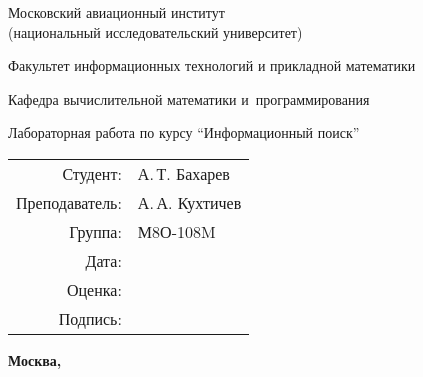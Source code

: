 \begin{titlepage}
\begin{center}
\bfseries

{\Large Московский авиационный институт\\ (национальный исследовательский университет)

}

\vspace{48pt}

{\large Факультет информационных технологий и прикладной математики
}

\vspace{36pt}

{\large Кафедра вычислительной математики и~программирования

}


\vspace{48pt}

Лабораторная работа  по курсу \enquote{Информационный поиск}

\end{center}

\vspace{72pt}

\begin{flushright}
\begin{tabular}{rl}
Студент: & А.\,Т. Бахарев \\
Преподаватель: & А.\,А. Кухтичев \\
Группа: & М8О-108M \\
Дата: & \\
Оценка: & \\
Подпись: & \\
\end{tabular}
\end{flushright}

\vfill

\begin{center}
\bfseries
Москва, \the\year
\end{center}
\end{titlepage}

\pagebreak
